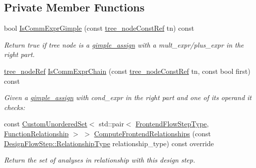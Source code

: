 \subsection*{Private Member Functions}
\begin{DoxyCompactItemize}
\item 
bool \hyperlink{classcommutative__expr__restructuring_a9eb19b39bada4a7aa58b2a479e778c16}{Is\+Comm\+Expr\+Gimple} (const \hyperlink{tree__node_8hpp_a3cf5d02292c940f3892425a5b5fdec3c}{tree\+\_\+node\+Const\+Ref} tn) const
\begin{DoxyCompactList}\small\item\em Return true if tree node is a \hyperlink{structgimple__assign}{gimple\+\_\+assign} with a mult\+\_\+expr/plus\+\_\+expr in the right part. \end{DoxyCompactList}\item 
\hyperlink{tree__node_8hpp_a6ee377554d1c4871ad66a337eaa67fd5}{tree\+\_\+node\+Ref} \hyperlink{classcommutative__expr__restructuring_a699aee44ff4dc9e16eb2200218fac8f0}{Is\+Comm\+Expr\+Chain} (const \hyperlink{tree__node_8hpp_a3cf5d02292c940f3892425a5b5fdec3c}{tree\+\_\+node\+Const\+Ref} tn, const bool first) const
\begin{DoxyCompactList}\small\item\em Given a \hyperlink{structgimple__assign}{gimple\+\_\+assign} with cond\+\_\+expr in the right part and one of its operand it checks\+: \end{DoxyCompactList}\item 
const \hyperlink{classCustomUnorderedSet}{Custom\+Unordered\+Set}$<$ std\+::pair$<$ \hyperlink{frontend__flow__step_8hpp_afeb3716c693d2b2e4ed3e6d04c3b63bb}{Frontend\+Flow\+Step\+Type}, \hyperlink{classFrontendFlowStep_af7cf30f2023e5b99e637dc2058289ab0}{Function\+Relationship} $>$ $>$ \hyperlink{classcommutative__expr__restructuring_af7722e53fe6fae4fb5aab7bfbb5146e3}{Compute\+Frontend\+Relationships} (const \hyperlink{classDesignFlowStep_a723a3baf19ff2ceb77bc13e099d0b1b7}{Design\+Flow\+Step\+::\+Relationship\+Type} relationship\+\_\+type) const override
\begin{DoxyCompactList}\small\item\em Return the set of analyses in relationship with this design step. \end{DoxyCompactList}\end{DoxyCompactItemize}
